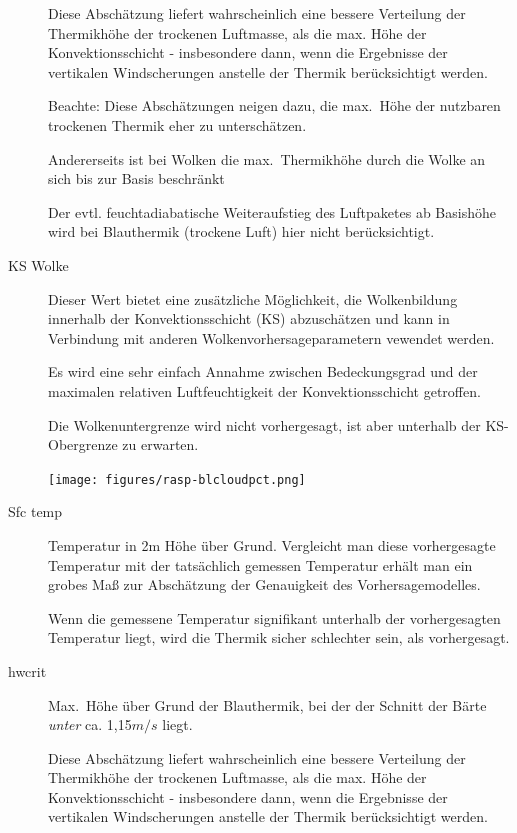 \begin{description}
Diese Abschätzung liefert  wahrscheinlich eine bessere Verteilung der Thermikhöhe
der trockenen Luftmasse, als die max. Höhe der Konvektionsschicht - insbesondere
dann, wenn die Ergebnisse der vertikalen Windscherungen anstelle der Thermik berücksichtigt
werden.

Beachte: Diese Abschätzungen neigen dazu, die max.\ Höhe der
nutzbaren trockenen Thermik eher zu unterschätzen.

Andererseits ist bei Wolken die max.\ Thermikhöhe durch  die Wolke an sich bis
zur Basis  beschränkt

Der evtl. feuchtadiabatische Weiteraufstieg des Luftpaketes ab Basishöhe wird bei
Blauthermik (trockene Luft) hier nicht berücksichtigt.

\item[KS Wolke]
Dieser Wert bietet eine zusätzliche Möglichkeit, die Wolkenbildung innerhalb der
Konvektionsschicht (KS) abzuschätzen und kann in Verbindung mit anderen
Wolkenvorhersageparametern vewendet werden.

Es wird eine sehr einfach Annahme zwischen Bedeckungsgrad und der maximalen
relativen Luftfeuchtigkeit der Konvektionsschicht getroffen.

Die Wolkenuntergrenze wird nicht vorhergesagt, ist aber unterhalb der
 KS-Obergrenze zu erwarten.


\begin{center}
\texttt{[image: figures/rasp-blcloudpct.png]}
\end{center}

\item[Sfc temp]
Temperatur in 2m Höhe über Grund.
Vergleicht man diese vorhergesagte Temperatur mit der tatsächlich gemessen Temperatur
erhält man ein grobes Maß  zur Abschätzung der Genauigkeit des Vorhersagemodelles.

Wenn die gemessene Temperatur signifikant unterhalb der vorhergesagten Temperatur
liegt, wird die Thermik sicher schlechter sein, als vorhergesagt.
\item[hwcrit]
Max.\ Höhe über Grund der Blauthermik, bei der der Schnitt der Bärte  \textsl{unter} ca. 1,15$m/s$ liegt.

Diese Abschätzung liefert  wahrscheinlich eine bessere Verteilung der Thermikhöhe
der trockenen Luftmasse, als die max. Höhe der Konvektionsschicht - insbesondere
dann, wenn die Ergebnisse der vertikalen Windscherungen anstelle der Thermik berücksichtigt
werden.


\end{description}
